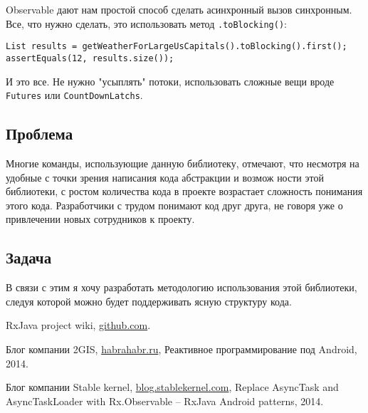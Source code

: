 \documentclass[12pt]{extarticle}
\begin{document}
Observable дают нам простой способ сделать асинхронный вызов синхронным. Все, что нужно сделать, это использовать метод \texttt{.toBlocking()}:

\begin{lstlisting}
List results = getWeatherForLargeUsCapitals().toBlocking().first();
assertEquals(12, results.size());
\end{lstlisting}

И это все. Не нужно "усыплять" потоки, использовать сложные вещи вроде \texttt{Futures} или \texttt{CountDownLatchs}.

\subsection{Проблема}
Многие команды, использующие данную библиотеку, отмечают, что несмотря на удобные с точки зрения написания кода абстракции и возмож
ности этой библиотеки, с ростом количества кода в проекте возрастает сложность понимания этого кода. Разработчики с трудом понимают код друг друга, не говоря уже о привлечении новых сотрудников к проекту.

\subsection{Задача}

В связи с этим я хочу разработать методологию использования этой библиотеки, следуя которой можно будет поддерживать ясную структуру кода.

\begin{thebibliography}{9}
  
	RxJava project wiki,
    \href{https://github.com/ReactiveX/RxJava/wiki}{github.com}.
  
	Блог компании 2GIS,
    \href{http://habrahabr.ru/company/2gis/blog/228125/}{habrahabr.ru},
    Реактивное программирование под Android,
    2014.
    
	Блог компании Stable kernel,
    \href{http://blog.stablekernel.com/replace-asynctask-asynctaskloader-rx-observable-rxjava-android-patterns/}{blog.stablekernel.com},
    Replace AsyncTask and AsyncTaskLoader with Rx.Observable – RxJava Android patterns,
    2014.
    


\end{thebibliography}
\end{document}

